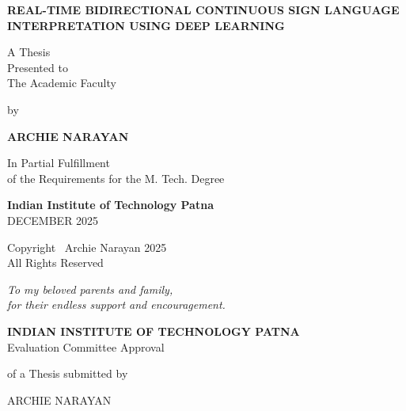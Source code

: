 \thispagestyle{empty}
\begin{center}

{\Large \bfseries REAL-TIME BIDIRECTIONAL CONTINUOUS SIGN LANGUAGE INTERPRETATION USING DEEP LEARNING}

\vspace{2cm}

A Thesis\\
Presented to\\
The Academic Faculty

\vspace{2cm}

by

\vspace{1cm}

{\large \bfseries ARCHIE NARAYAN}

\vspace{2cm}

In Partial Fulfillment\\
of the Requirements for the M. Tech. Degree

\vspace{2cm}

{\large \bfseries Indian Institute of Technology Patna}\\
DECEMBER 2025

\vspace{1.5cm}

Copyright \textcopyright\ Archie Narayan 2025\\
All Rights Reserved

\end{center}

\clearpage

\thispagestyle{empty}
\vspace*{3cm}
\begin{center}
\textit{To my beloved parents and family,\\ for their endless support and encouragement.}
\end{center}
\clearpage

\thispagestyle{empty}
\begin{center}
{\Large \bfseries INDIAN INSTITUTE OF TECHNOLOGY PATNA}\\[0.5cm]
{\large Evaluation Committee Approval}

\vspace{0.5cm}

of a Thesis submitted by

\vspace{0.5cm}

ARCHIE NARAYAN
\end{center}

